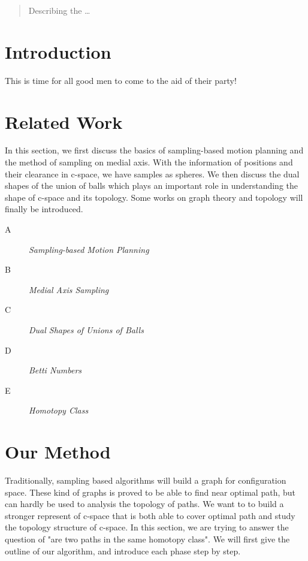 \documentclass[11pt]{article}
\begin{document}
\maketitle

\begin{abstract}
Describing the  \ldots
\end{abstract}

\section{Introduction}
This is time for all good men to come to the aid of their party!

\section{Related Work}\label{related work}
In this section, we first discuss the basics of sampling-based motion planning and the method of sampling on medial axis. With the information of positions and their clearance in c-space, we have samples as spheres. We then discuss the dual shapes of the union of balls which plays an important role in understanding the shape of c-space and its topology. Some works on graph theory and topology will finally be introduced. 

\begin{description}
\item[A] \emph{Sampling-based Motion Planning} \hfill \\

\item[B] \emph{Medial Axis Sampling} \hfill \\

\item[C] \emph{Dual Shapes of Unions of Balls} \hfill\\

\item[D] \emph{Betti Numbers} \hfill \\

\item[E] \emph{Homotopy Class} \hfill \\

\end{description}

\section{Our Method}\label{method}

Traditionally, sampling based algorithms will build a graph for configuration space. These kind of graphs is proved to be able to find near optimal path, but can hardly be used to analysis the topology of paths. We want to to build a stronger represent of c-space that is both able to cover optimal path and study the topology structure of c-space. In this section, we are trying to answer the question of "are two paths in the same homotopy class". We will first give the outline of our algorithm, and introduce each phase step by step. 
\end{document}
